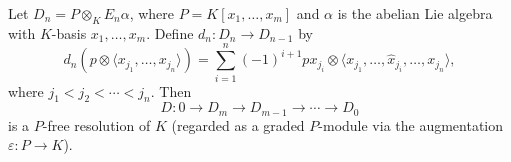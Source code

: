 Let $D_n = P \otimes_K E_n \alpha$, where $P = K[x_1, \ldots, x_m]$ and $\alpha$ is the abelian Lie algebra with $K$-basis $x_1, \ldots, x_m$. Define $d_n : D_n \rightarrow D_{n-1}$ by
$$d_n(p \otimes \langle x_{j_1}, \ldots, x_{j_n} \rangle) = \sum_{i=1}^{n} (-1)^{i+1} p x_{j_i} \otimes \langle x_{j_1}, \ldots, \hat{x}_{j_i}, \ldots, x_{j_n} \rangle,$$
where $j_1 < j_2 < \cdots < j_n$. Then
$$D : 0 \rightarrow D_m \rightarrow D_{m-1} \rightarrow \cdots \rightarrow D_0$$
is a $P$-free resolution of $K$ (regarded as a graded $P$-module via the augmentation $\varepsilon : P \rightarrow K$).
